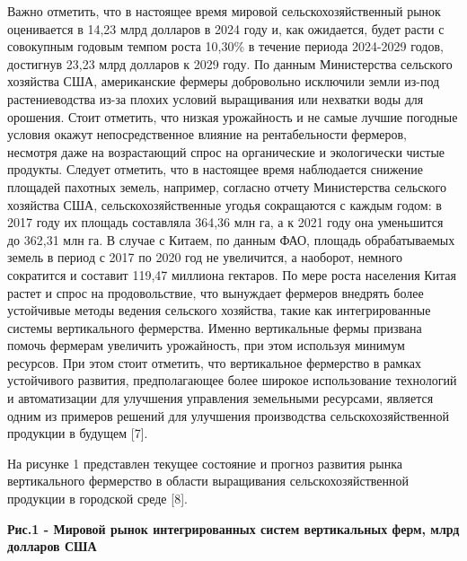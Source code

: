Важно отметить, что в настоящее время мировой сельскохозяйственный рынок
оценивается в 14,23 млрд долларов в 2024 году и, как ожидается, будет
расти с совокупным годовым темпом роста 10,30\% в течение периода
2024-2029 годов, достигнув 23,23 млрд долларов к 2029 году. По данным
Министерства сельского хозяйства США, американские фермеры добровольно
исключили земли из-под растениеводства из-за плохих условий выращивания
или нехватки воды для орошения. Стоит отметить, что низкая урожайность и
не самые лучшие погодные условия окажут непосредственное влияние на
рентабельности фермеров, несмотря даже на возрастающий спрос на
органические и экологически чистые продукты. Следует отметить, что в
настоящее время наблюдается снижение площадей пахотных земель, например,
согласно отчету Министерства сельского хозяйства США,
сельскохозяйственные угодья сокращаются с каждым годом: в 2017 году их
площадь составляла 364,36 млн га, а к 2021 году она уменьшится до 362,31
млн га. В случае с Китаем, по данным ФАО, площадь обрабатываемых земель
в период с 2017 по 2020 год не увеличится, а наоборот, немного
сократится и составит 119,47 миллиона гектаров. По мере роста населения
Китая растет и спрос на продовольствие, что вынуждает фермеров внедрять
более устойчивые методы ведения сельского хозяйства, такие как
интегрированные системы вертикального фермерства. Именно вертикальные
фермы призвана помочь фермерам увеличить урожайность, при этом используя
минимум ресурсов. При этом стоит отметить, что вертикальное фермерство в
рамках устойчивого развития, предполагающее более широкое использование
технологий и автоматизации для улучшения управления земельными
ресурсами, является одним из примеров решений для улучшения производства
сельскохозяйственной продукции в будущем {[}7{]}.

На рисунке 1 представлен текущее состояние и прогноз развития рынка
вертикального фермерство в области выращивания сельскохозяйственной
продукции в городской среде {[}8{]}.


{\bfseries Рис.1 - Мировой рынок интегрированных систем вертикальных ферм,
млрд долларов США}

